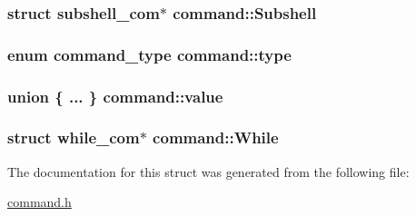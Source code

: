 \subsubsection[{\texorpdfstring{Subshell}{Subshell}}]{\setlength{\rightskip}{0pt plus 5cm}struct {\bf subshell\+\_\+com}$\ast$ command\+::\+Subshell}\hypertarget{structcommand_a31087dc3fce667d2ded99e645149afa6}{}\label{structcommand_a31087dc3fce667d2ded99e645149afa6}
\subsubsection[{\texorpdfstring{type}{type}}]{\setlength{\rightskip}{0pt plus 5cm}enum {\bf command\+\_\+type} command\+::type}\hypertarget{structcommand_adc520136f05efbf94b38913f7d8b1f31}{}\label{structcommand_adc520136f05efbf94b38913f7d8b1f31}
\subsubsection[{\texorpdfstring{value}{value}}]{\setlength{\rightskip}{0pt plus 5cm}union \{ ... \}   command\+::value}\hypertarget{structcommand_adda5d5d9646a55d8cf1f8b64612af756}{}\label{structcommand_adda5d5d9646a55d8cf1f8b64612af756}
\subsubsection[{\texorpdfstring{While}{While}}]{\setlength{\rightskip}{0pt plus 5cm}struct {\bf while\+\_\+com}$\ast$ command\+::\+While}\hypertarget{structcommand_a770073860411c3d15cc533862688d035}{}\label{structcommand_a770073860411c3d15cc533862688d035}


The documentation for this struct was generated from the following file\+:\begin{DoxyCompactItemize}
\item 
\hyperlink{command_8h}{command.\+h}\end{DoxyCompactItemize}
